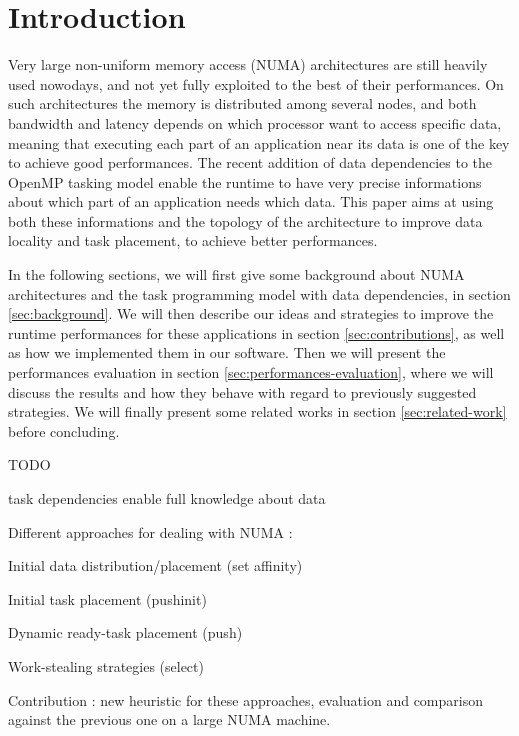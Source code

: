 \documentclass{Styles/llncs}
\begin{document}
\section{Introduction}

Very large non-uniform memory access (NUMA) architectures are still heavily used
nowodays, and not yet fully exploited to the best of their performances.
On such architectures the memory is distributed among several nodes, and
both bandwidth and latency depends on which processor want to access specific data,
meaning that executing each part of an application near its data is one of the key to achieve good
performances.
The recent addition of data dependencies to the OpenMP tasking model enable the
runtime to have very precise informations about which part of an application
needs which data.
This paper aims at using both these informations and the topology of the architecture
to improve data locality and task placement, to achieve better performances.

In the following sections, we will first give some background about NUMA architectures
and the task programming model with data dependencies, in section \ref{sec:background}.
We will then describe our ideas and strategies to improve the runtime performances
for these applications in section \ref{sec:contributions},
as well as how we implemented them in our software. Then we will present the performances
evaluation in section \ref{sec:performances-evaluation}, where we will discuss
the results and how they behave with regard to previously suggested strategies.
We will finally present some related works in section \ref{sec:related-work}
before concluding.

TODO

task dependencies enable full knowledge about data

Different approaches for dealing with NUMA :

Initial data distribution/placement (set affinity)

Initial task placement (pushinit)

Dynamic ready-task placement (push)

Work-stealing strategies (select)

Contribution : new heuristic for these approaches, evaluation and comparison against the previous one on a large NUMA machine.



\end{document}
